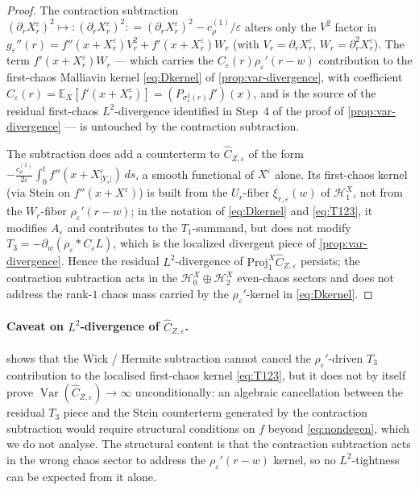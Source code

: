 \documentclass[11pt,reqno]{amsart}
\theoremstyle{plain}
\theoremstyle{definition}
\theoremstyle{remark}
\newcommand{\E}{\mathbb{E}}
\newcommand{\Hilb}{\mathcal{H}}
\newcommand{\IBM}{Z}
\DeclareMathOperator{\Var}{Var}
\begin{document}
\begin{proof}
The contraction subtraction
$(\partial_rX^\varepsilon_r)^{2}\mapsto:(\partial_rX^\varepsilon_r)^{2}:
=(\partial_rX^\varepsilon_r)^{2}-c_\rho^{(1)}/\varepsilon$ alters only
the $V^{2}$ factor in
$g_\varepsilon''(r)=f''(x+X^\varepsilon_r)V_r^{2}+f'(x+X^\varepsilon_r)W_r$
(with $V_r=\partial_rX^\varepsilon_r$, $W_r=\partial_r^{2}X^\varepsilon_r$).
The term $f'(x+X^\varepsilon_r)W_r$ --- which carries the
$C_\varepsilon(r)\rho_\varepsilon'(r-w)$ contribution to the
first-chaos Malliavin kernel \eqref{eq:Dkernel} of
\cref{prop:var-divergence}, with coefficient
$C_\varepsilon(r)=\E_X[f'(x+X^\varepsilon_r)]=(P_{\sigma_\varepsilon^{2}(r)}f')(x)$,
and is the source of the residual first-chaos $L^{2}$-divergence
identified in Step~4 of the proof of \cref{prop:var-divergence} ---
is untouched by the contraction subtraction.

The subtraction does add a counterterm to $\widehat C_{\IBM,\varepsilon}$
of the form $-\tfrac{c_\rho^{(1)}}{2\varepsilon}\int_0^t
f''(x+X^\varepsilon_{|Y_s|})\,ds$, a smooth functional of $X^\varepsilon$
alone. Its first-chaos kernel (via Stein on $f''(x+X^\varepsilon)$)
is built from the $U_r$-fiber $\xi_{r,\varepsilon}(w)$ of
$\Hilb_1^{X}$, not from the $W_r$-fiber $\rho_\varepsilon'(r-w)$; in
the notation of \eqref{eq:Dkernel} and \eqref{eq:T123}, it modifies
$A_\varepsilon$ and contributes to the $T_1$-summand, but does not
modify $T_3=-\partial_w(\rho_\varepsilon*C_\varepsilon L)$, which is
the localized divergent piece of \cref{prop:var-divergence}. Hence
the residual $L^{2}$-divergence of
$\mathrm{Proj}_1^{X}\widehat C_{\IBM,\varepsilon}$ persists; the
contraction subtraction acts in the
$\Hilb_0^{X}\oplus\Hilb_2^{X}$ even-chaos sectors and does not
address the rank-$1$ chaos mass carried by the $\rho_\varepsilon'$-kernel
in \eqref{eq:Dkernel}.
\end{proof}

\paragraph{Caveat on $L^{2}$-divergence of $\widehat C_{\IBM,\varepsilon}$.}
 shows that the Wick / Hermite
subtraction cannot cancel the $\rho_\varepsilon'$-driven $T_3$
contribution to the localised first-chaos kernel
\eqref{eq:T123}, but it does not by itself prove
$\Var(\widehat C_{\IBM,\varepsilon})\to\infty$ unconditionally:
an algebraic cancellation between the residual $T_3$ piece and the
Stein counterterm generated by the contraction subtraction would
require structural conditions on $f$ beyond \eqref{eq:nondegen},
which we do not analyse. The structural content is that the
contraction subtraction acts in the wrong chaos sector to address
the $\rho_\varepsilon'(r-w)$ kernel, so no $L^{2}$-tightness can be
expected from it alone.
\end{document}
